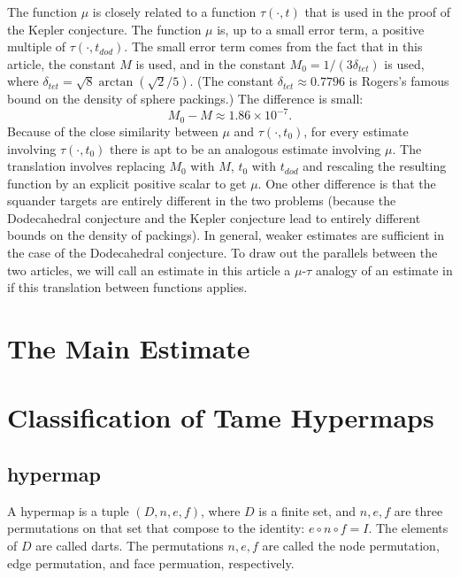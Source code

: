 \begin{remark}\label{rem:sq} The function $\mu$ is closely related to a function
$\tau(\cdot,t)$ that is used in the proof of the Kepler conjecture.  The
function $\mu$ is, up to a small error term, a positive multiple
of $\tau(\cdot,t_{dod})$.   The small
error term comes from the fact that in this article, the constant
$M$ is used, and in \cite{DCG} the constant
$M_0=1/(3 \delta_{tet})$ is used, where $\delta_{tet} = \sqrt8 \arctan(\sqrt2/5)$.  (The constant $\delta_{tet}\approx 0.7796$ is Rogers's famous bound on the density of sphere packings.)  The difference is small:
   $$M_0 - M \approx 1.86 \times 10^{-7}.$$
Because of the close similarity between $\mu$ and $\tau(\cdot,t_0)$,
for every estimate involving $\tau(\cdot,t_0)$ there is apt to
be an analogous estimate involving $\mu$.  The translation involves
replacing $M_0$ with $M$, $t_0$ with $t_{dod}$ and rescaling the
resulting function by an explicit positive scalar to get $\mu$.
One other difference is that the squander targets are entirely different
in the two problems (because the Dodecahedral conjecture and the
Kepler conjecture lead to entirely different bounds on the density
of packings).  In general, weaker estimates are sufficient in the
case of the Dodecahedral conjecture.
To draw out the parallels between the two articles, we will call
an estimate in this article a $\mu$-$\tau$ analogy of an estimate
in \cite{DCG} if this translation between functions applies.
\end{remark}



\section{The Main Estimate}



\section{Classification of Tame Hypermaps}

\subsection{hypermap}

A hypermap is a tuple $(D,n,e,f)$, where $D$ is a finite
set, and $n,e,f$ are three permutations on that set that
compose to the identity:
$e\circ n\circ f = I$.  The elements of $D$ are called darts.
The permutations $n,e,f$ are called the node permutation,
edge permutation, and face permuation, respectively.

